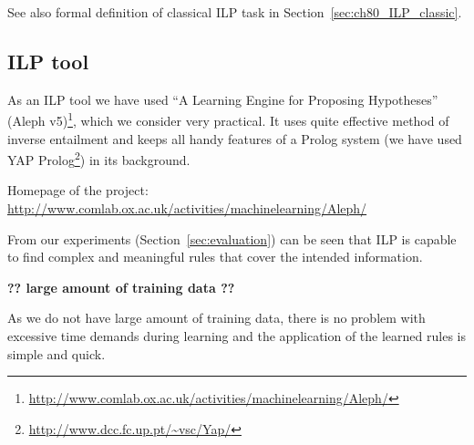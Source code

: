 See also formal definition of classical ILP task in Section~\ref{sec:ch80_ILP_classic}.

\subsection{ILP tool}
As an ILP tool we have used ``A Learning Engine for Proposing Hypotheses'' (Aleph v5)\footnote{\url{http://www.comlab.ox.ac.uk/activities/machinelearning/Aleph/}}, which we consider very practical. It uses quite effective method of inverse entailment \citep{biblio:InverseEntailment} and keeps all handy features of a Prolog system (we have used YAP Prolog\footnote{\url{http://www.dcc.fc.up.pt/~vsc/Yap/}}) in its background.

\medskip
Homepage of the project: \url{http://www.comlab.ox.ac.uk/activities/machinelearning/Aleph/}



From our experiments (Section~\ref{sec:evaluation}) can be seen that ILP is capable to find complex and meaningful rules that cover the intended information.



\textbf{?? large amount of training data ??}

As we do not have large amount of training data, there is no problem with excessive time demands during learning and the application of the learned rules is simple and quick.



